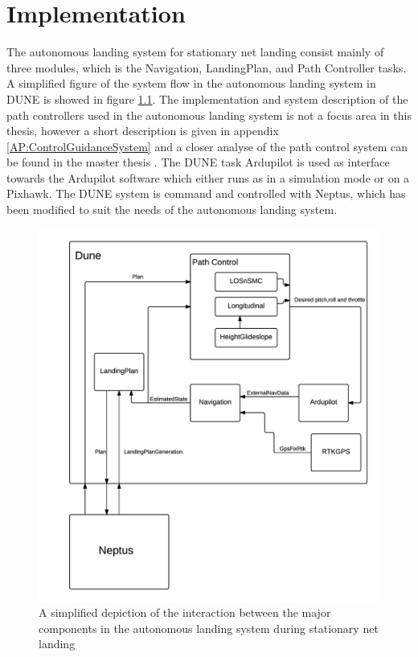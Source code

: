 \chapter{Implementation}
The autonomous landing system for stationary net landing consist mainly of three modules, which is the Navigation, LandingPlan, and Path Controller tasks. A simplified figure of the system flow in the autonomous landing system in DUNE is showed in figure \ref{fig:DuneSystem}. The implementation and system description of the path controllers used in the autonomous landing system is not a focus area in this thesis, however a short description is given in appendix \ref{AP:ControlGuidanceSystem} and a closer analyse of the path control system can be found in the master thesis \citep{Sigurd}. The DUNE task Ardupilot is used as interface towards the Ardupilot software which either runs as in a simulation mode or on a Pixhawk. The DUNE system is command  and controlled with Neptus, which has been modified to suit the needs of the autonomous landing system.
\begin{figure}[H]
	\centering
		\includegraphics[scale=0.8]{figs/DUNESystem.png}
		\caption{A simplified depiction of the interaction between the major components in the autonomous landing system during stationary net landing}
		\label{fig:DuneSystem}
\end{figure}
